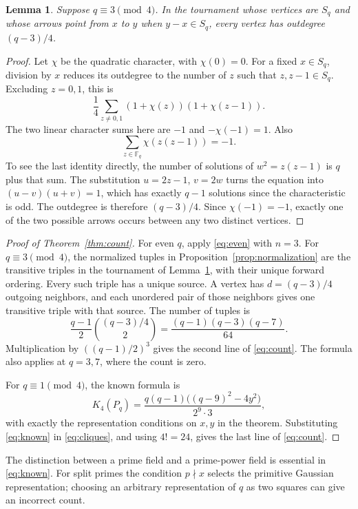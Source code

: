 \documentclass[11pt]{article}
\newtheorem{lemma}[theorem]{Lemma}
\newcommand{\F}{\mathbb F}
\begin{document}
\begin{lemma}\label{lem:tournament}
Suppose $q\equiv3\pmod4$. In the tournament whose vertices are $S_q$ and whose arrows point from $x$ to $y$ when $y-x\in S_q$, every vertex has outdegree $(q-3)/4$.
\end{lemma}
\begin{proof}
Let $\chi$ be the quadratic character, with $\chi(0)=0$. For a fixed $x\in S_q$, division by $x$ reduces its outdegree to the number of $z$ such that $z,z-1\in S_q$. Excluding $z=0,1$, this is
\[
 \frac14\sum_{z\ne0,1}(1+\chi(z))(1+\chi(z-1)).
\]
The two linear character sums here are $-1$ and $-\chi(-1)=1$. Also
\[
 \sum_{z\in\F_q}\chi(z(z-1))=-1.
\]
To see the last identity directly, the number of solutions of $w^2=z(z-1)$ is $q$ plus that sum. The substitution $u=2z-1$, $v=2w$ turns the equation into $(u-v)(u+v)=1$, which has exactly $q-1$ solutions since the characteristic is odd. The outdegree is therefore $(q-3)/4$. Since $\chi(-1)=-1$, exactly one of the two possible arrows occurs between any two distinct vertices.
\end{proof}

\begin{proof}[Proof of Theorem~\ref{thm:count}]
For even $q$, apply \eqref{eq:even} with $n=3$. For $q\equiv3\pmod4$, the normalized tuples in Proposition~\ref{prop:normalization} are the transitive triples in the tournament of Lemma~\ref{lem:tournament}, with their unique forward ordering. Every such triple has a unique source. A vertex has $d=(q-3)/4$ outgoing neighbors, and each unordered pair of those neighbors gives one transitive triple with that source. The number of tuples is
\[
 \frac{q-1}{2}\binom{(q-3)/4}{2}
 =\frac{(q-1)(q-3)(q-7)}{64}.
\]
Multiplication by $((q-1)/2)^3$ gives the second line of \eqref{eq:count}. The formula also applies at $q=3,7$, where the count is zero.

For $q\equiv1\pmod4$, the known formula \cite[Corollary~2.3]{DM} is
\begin{equation}\label{eq:known}
 K_4(P_q)=\frac{q(q-1)\big((q-9)^2-4y^2\big)}{2^9\cdot3},
\end{equation}
with exactly the representation conditions on $x,y$ in the theorem. Substituting \eqref{eq:known} in \eqref{eq:cliques}, and using $4!=24$, gives the last line of \eqref{eq:count}.
\end{proof}

The distinction between a prime field and a prime-power field is essential in \eqref{eq:known}. For split primes the condition $p\nmid x$ selects the primitive Gaussian representation; choosing an arbitrary representation of $q$ as two squares can give an incorrect count.
\end{document}
